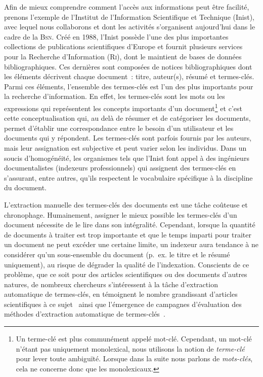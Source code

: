       Afin de mieux comprendre comment l'accès aux informations peut être
      facilité, prenons l'exemple de l'Institut de l'Information Scientifique et
      Technique (Inist), avec lequel nous collaborons et dont les activités
      s'organisent aujourd'hui dans le cadre de la \textsc{Bsn}. Créé en 1988,
      l'Inist possède l'une des plus importantes collections de publications
      scientifiques d'Europe et fournit plusieurs services pour la Recherche
      d'Information (\textsc{Ri}), dont le maintient de bases de données
      bibliographiques. Ces dernières sont composées de notices bibliographiques
      dont les éléments décrivent chaque document~: titre, auteur(s), résumé et
      termes-clés. Parmi ces éléments, l'ensemble des termes-clés est l'un des
      plus importants pour la recherche d'information. En effet, les termes-clés
      sont les mots ou les expressions qui représentent les concepts importants
      d'un document\footnote{Un terme-clé est plus communément appelé mot-clé.
      Cependant, un mot-clé n'étant pas uniquement monolexical, nous utilisons
      la notion de \textit{terme-clé} pour lever toute ambiguïté. Lorsque dans
      la suite nous parlons de \textit{mots-clés}, cela ne concerne donc que les
      monolexicaux.} et c'est cette conceptualisation qui, au delà de résumer et
      de catégoriser les documents, permet d'établir une correspondance entre le
      besoin d'un utilisateur et les documents qui y répondent. Les termes-clés
      sont parfois fournis par les auteurs, mais leur assignation est subjective
      et peut varier selon les individus. Dans un soucis d'homogénéité, les
      organismes tels que l'Inist font appel à des ingénieurs documentalistes
      (indexeurs professionnels) qui assignent des termes-clés en s'assurant,
      entre autres, qu'ils respectent le vocabulaire spécifique à la discipline
      du document.

      L'extraction manuelle des termes-clés des documents est une tâche coûteuse
      et chronophage. Humainement, assigner le mieux possible les termes-clés
      d'un document nécessite de le lire dans son intégralité. Cependant,
      lorsque la quantité de documents à traiter est trop importante et que le
      temps imparti pour traiter un document ne peut excéder une certaine
      limite, un indexeur aura tendance à ne considérer qu'un sous-ensemble du
      document (p.~ex. le titre et le résumé uniquement), au risque de dégrader
      la qualité de l'indexation.
      Conscients de ce problème, que ce soit pour des articles
      scientifiques ou des documents d'autres natures, de nombreux chercheurs
      s'intéressent à la tâche d'extraction automatique de termes-clés, en
      témoignent le nombre grandissant d'articles scientifiques à ce
      sujet~\citep{hasan2014state_of_the_art} ainsi que l'émergence de campagnes
      d'évaluation des méthodes d'extraction automatique de
      termes-clés~\citep{kim2010semeval,paroubek2012deft}.


